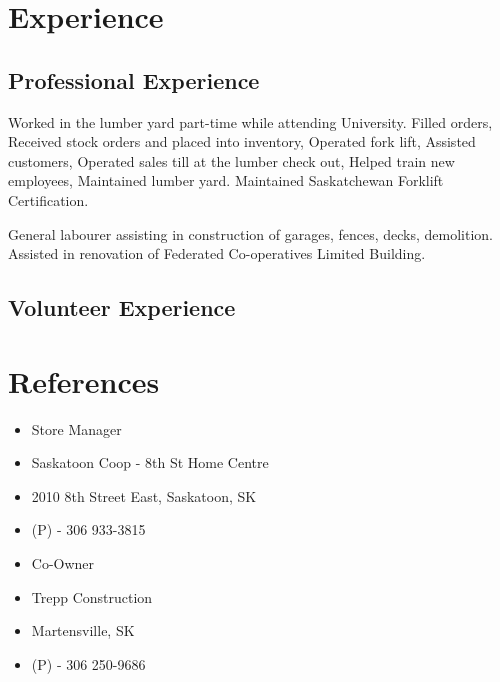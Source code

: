 \documentclass[11pt,letterpaper,sans]{moderncv}        %
\begin{document}
\section{Experience}
\subsection{Professional Experience}
{
  Worked in the lumber yard part-time while attending University.
  \newline{}
  Filled orders, Received stock orders and placed into inventory, Operated fork lift, Assisted customers, Operated sales till at the lumber check out, Helped train new employees, Maintained lumber yard. Maintained Saskatchewan Forklift Certification.
}

{
  General labourer assisting in construction of garages, fences, decks, demolition. Assisted in renovation of Federated Co-operatives Limited Building.
}

\subsection{Volunteer Experience}



\section{References}
{
  \begin{itemize}
    \item Store Manager
    \item Saskatoon Coop - 8th St Home Centre
    \item 2010 8th Street East, Saskatoon, SK
    \item (P) - 306 933-3815
  \end{itemize}
}

{
  \begin{itemize}
    \item Co-Owner
    \item Trepp Construction
    \item Martensville, SK
    \item (P) - 306 250-9686
  \end{itemize}
}
\end{document}
